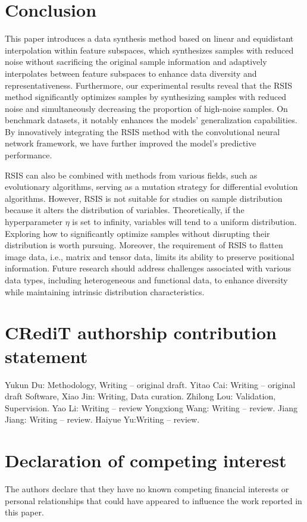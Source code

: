 \documentclass[final,3p,times]{elsarticle}
\begin{document}

\section{Conclusion}
This paper introduces a data synthesis method based on linear and 
equidistant interpolation within feature subspaces, which 
synthesizes samples with reduced noise without sacrificing 
the original sample information and adaptively interpolates 
between feature subspaces to enhance data diversity and 
representativeness. Furthermore, our experimental results reveal 
that the RSIS method significantly optimizes samples by 
synthesizing samples with reduced noise and simultaneously 
decreasing the proportion of high-noise samples. On benchmark 
datasets, it notably enhances the models' generalization 
capabilities. By innovatively integrating the RSIS method with 
the convolutional neural network framework, we have further 
improved the model's predictive performance.

{RSIS can also be combined with methods from various fields, such as evolutionary algorithms, serving as a mutation strategy for differential evolution algorithms.} However, RSIS is not suitable for studies on sample distribution because it alters 
the distribution of variables. Theoretically, if {the}
hyperparameter $\eta$ is set to infinity, variables will 
tend to a uniform distribution. Exploring how to significantly 
optimize samples without disrupting their distribution is worth 
pursuing. {Moreover, the requirement of RSIS to flatten image data, i.e., matrix and tensor data, limits its ability to preserve positional information. Future research should address challenges associated with various data types, including heterogeneous and functional data, to enhance diversity while maintaining intrinsic distribution characteristics.}



\section*{CRediT authorship contribution statement}
Yukun Du: Methodology, Writing – original draft. Yitao Cai: Writing – original draft
Software,  Xiao Jin: Writing, Data curation.   Zhilong Lou: Validation, Supervision.  Yao Li: Writing – review Yongxiong Wang: Writing – review. Jiang Jiang: Writing – review. Haiyue Yu:Writing – review.

\section*{Declaration of competing interest}
The authors declare that they have no known competing financial interests or personal relationships that could have appeared to
influence the work reported in this paper.
\end{document}
